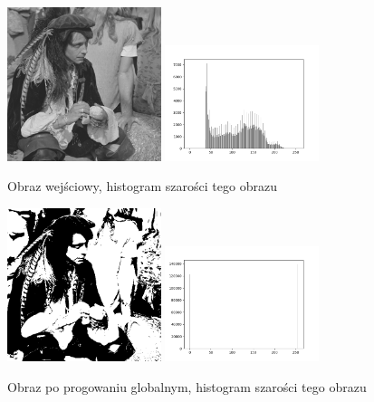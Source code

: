 \documentclass[final,a4paper,openany,12pt]{mwbk}
\begin{document}
\begin{figure}[H]
	\begin{center}
		\includegraphics[width=0.4\textwidth]{pirate_gray}
		\includegraphics[width=0.4\textwidth]{pirate_gray_histogram}
	\end{center}
	\caption{Obraz wejściowy, histogram szarości tego obrazu}
\end{figure}

\begin{figure}[H]
	\begin{center}
		\includegraphics[width=0.4\textwidth]{pirate_gray_globThreshold_result}
		\includegraphics[width=0.4\textwidth]{pirate_gray_globThreshold_histogram}
	\end{center}
	\caption{Obraz po progowaniu globalnym, histogram szarości tego obrazu}
\end{figure}
\end{document}
